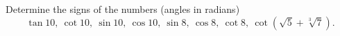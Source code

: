 Determine the signs of the numbers (angles in radians)
\[\tan10,\ \cot10,\ \sin10,\ \cos10,\ \sin8,\ \cos8,\ \cot8,\ \cot\left(\sqrt5+\sqrt[3]7\right).\]
